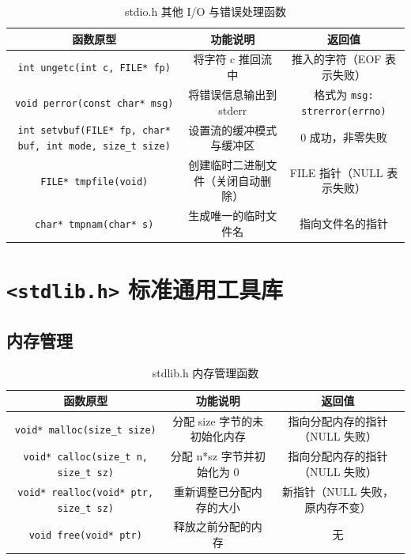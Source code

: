 \begin{table}[H]
\centering
\small
\renewcommand{\arraystretch}{1.5}
\begin{tabulary}{\linewidth}{CCC}
\toprule
\textbf{函数原型} & \textbf{功能说明} & \textbf{返回值} \\ \midrule
\texttt{int ungetc(int c, FILE* fp)} & 将字符 c 推回流中 & 推入的字符（EOF 表示失败） \\ 
\texttt{void perror(const char* msg)} & 将错误信息输出到 stderr & 格式为 \texttt{msg: strerror(errno)} \\ 
\texttt{int setvbuf(FILE* fp, char* buf, int mode, size\_t size)} & 设置流的缓冲模式与缓冲区 & 0 成功，非零失败 \\ 
\texttt{FILE* tmpfile(void)} & 创建临时二进制文件（关闭自动删除） & FILE 指针（NULL 表示失败） \\ 
\texttt{char* tmpnam(char* s)} & 生成唯一的临时文件名 & 指向文件名的指针 \\ \bottomrule
\end{tabulary}
\caption{stdio.h 其他 I/O 与错误处理函数}
\label{tab:stdio_other}
\end{table}

\section{\texorpdfstring{\texttt{<stdlib.h>} 标准通用工具库}{<stdlib.h> 标准通用工具库}}

\subsection{内存管理}

\begin{table}[H]
\centering
\small
\renewcommand{\arraystretch}{1.6}
\begin{tabulary}{\linewidth}{CCC}
\toprule
\textbf{函数原型} & \textbf{功能说明} & \textbf{返回值} \\ \midrule
\texttt{void* malloc(size\_t size)} & 分配 size 字节的未初始化内存 & 指向分配内存的指针（NULL 失败） \\ 
\texttt{void* calloc(size\_t n, size\_t sz)} & 分配 n*sz 字节并初始化为 0 & 指向分配内存的指针（NULL 失败） \\ 
\texttt{void* realloc(void* ptr, size\_t sz)} & 重新调整已分配内存的大小 & 新指针（NULL 失败，原内存不变） \\ 
\texttt{void free(void* ptr)} & 释放之前分配的内存 & 无 \\ \bottomrule
\end{tabulary}
\caption{stdlib.h 内存管理函数}
\label{tab:stdlib_mem}
\end{table}


